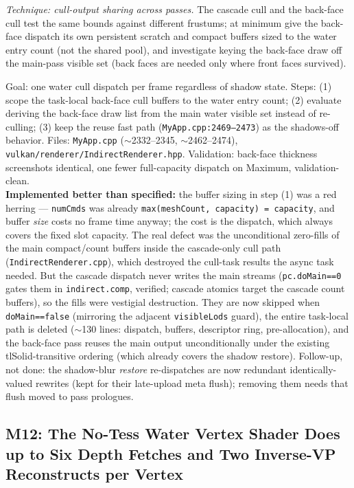 \documentclass[11pt,a4paper]{article}
\begin{document}
\textit{Technique: cull-output sharing across passes.} The cascade cull and
the back-face cull test the same bounds against different frustums; at minimum
give the back-face dispatch its own persistent scratch and compact buffers
sized to the water entry count (not the shared pool), and investigate keying
the back-face draw off the main-pass visible set (back faces are needed only
where front faces survived).

\begin{tcolorbox}[promptbox={Prompt --- M11: stop paying a second full water cull}]
Goal: one water cull dispatch per frame regardless of shadow state. Steps:
(1) scope the task-local back-face cull buffers to the water entry count;
(2) evaluate deriving the back-face draw list from the main water visible set
instead of re-culling; (3) keep the reuse fast path
(\texttt{MyApp.cpp:2469--2473}) as the shadows-off behavior. Files:
\texttt{MyApp.cpp} ($\sim$2332--2345, $\sim$2462--2474),
\texttt{vulkan/renderer/IndirectRenderer.hpp}. Validation: back-face thickness
screenshots identical, one fewer full-capacity dispatch on Maximum,
validation-clean.
\\ \textbf{Implemented better than specified:} the buffer sizing in step (1)
was a red herring --- \texttt{numCmds} was already
\texttt{max(meshCount, capacity) = capacity}, and buffer \emph{size} costs no
frame time anyway; the cost is the dispatch, which always covers the fixed
slot capacity. The real defect was the unconditional zero-fills of the main
compact/count buffers inside the cascade-only cull path
(\texttt{IndirectRenderer.cpp}), which destroyed the cull-task results the
async task needed. But the cascade dispatch never writes the main streams
(\texttt{pc.doMain==0} gates them in \texttt{indirect.comp}, verified;
cascade atomics target the cascade count buffers), so the fills were
vestigial destruction. They are now skipped when \texttt{doMain==false}
(mirroring the adjacent \texttt{visibleLods} guard), the entire task-local
path is deleted ($\sim$130 lines: dispatch, buffers, descriptor ring,
pre-allocation), and the back-face pass reuses the main output unconditionally
under the existing tlSolid-transitive ordering (which already covers the
shadow restore). Follow-up, not done: the shadow-blur \emph{restore}
re-dispatches are now redundant identically-valued rewrites (kept for their
late-upload meta flush); removing them needs that flush moved to pass
prologues.
\end{tcolorbox}

\subsection{M12: The No-Tess Water Vertex Shader Does up to Six Depth Fetches and Two Inverse-VP Reconstructs per Vertex}
\label{sec:m12}
\end{document}
